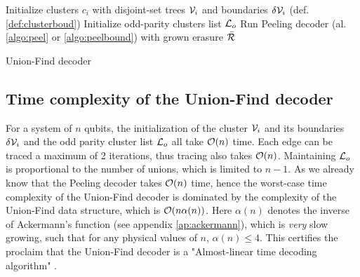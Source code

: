 \begin{algorithm}[htb]
  \BlankLine
  \BlankLine
  Initialize clusters $c_i$ with disjoint-set trees $\mathcal{V}_i$ and boundaries $\delta \mathcal{V}_i$ (def. \ref{def:clusterboud})\;
  Initialize odd-parity clusters list $\mathcal{L}_o$\;
  \BlankLine
  Run Peeling decoder (al. \ref{algo:peel} or \ref{algo:peelbound}) with grown erasure $\bar{\mathcal{R}}$
  \BlankLine
  \caption{Union-Find decoder \cite{delfosse2017almost}}\label{algo:uf}
\end{algorithm}

\subsection{Time complexity of the Union-Find decoder}

For a system of $n$ qubits, the initialization of the cluster $\mathcal{V}_i$ and its boundaries $\delta \mathcal{V}_i$ and the odd parity cluster list $\mathcal{L}_o$ all take $\mathcal{O}(n)$ time. Each edge can be traced a maximum of 2 iterations, thus tracing also takes $\mathcal{O}(n)$. Maintaining $\mathcal{L}_o$ is proportional to the number of unions, which is limited to $n-1$. As we already know that the Peeling decoder takes $\mathcal{O}(n)$ time, hence the worst-case time complexity of the Union-Find decoder is dominated by the complexity of the Union-Find data structure, which is $\mathcal{O}(n\alpha(n))$. Here $\alpha(n)$ denotes the inverse of Ackermann's function (see appendix \ref{ap:ackermann}), which is \emph{very} slow growing, such that for any physical values of $n$, $\alpha(n) \leq 4$. This certifies the proclaim that the Union-Find decoder is a "Almost-linear time decoding algorithm" \cite{delfosse2017almost}. 

